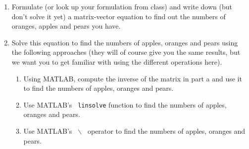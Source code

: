 \begin{prob}
\begin{enumerate}
    \begin{enumerate}
    \item Formulate (or look up your formulation from class) and write down (but don't solve it yet) a matrix-vector equation to find out the numbers of oranges, apples and pears you have.
    
    \item Solve this equation to find the numbers of apples, oranges and pears using the following approaches (they will of course give you the same results, but we want you to get familiar with using the different operations here).
        \begin{enumerate}
        \item Using MATLAB, compute the inverse of the matrix in part a and use it to find the numbers of apples, oranges and pears.
        \item Use MATLAB's \texttt{ linsolve} function to find the  numbers of apples, oranges and pears.
        \item Use MATLAB's \texttt{ $\backslash$ } operator to find the  numbers of apples, oranges and pears.
        \end{enumerate}
    \end{enumerate}
\end{enumerate}
\end{prob}

